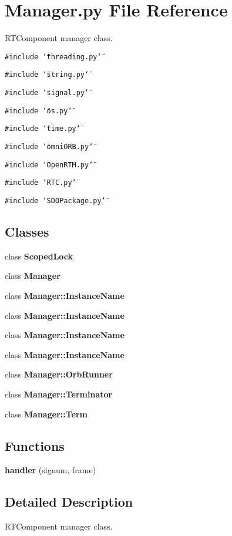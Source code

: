 \section{Manager.py File Reference}
\label{Manager_8py}
RTComponent manager class. 

{\tt \#include \char`\"{}threading.py\char`\"{}}\par
{\tt \#include \char`\"{}string.py\char`\"{}}\par
{\tt \#include \char`\"{}signal.py\char`\"{}}\par
{\tt \#include \char`\"{}os.py\char`\"{}}\par
{\tt \#include \char`\"{}time.py\char`\"{}}\par
{\tt \#include \char`\"{}omni\-ORB.py\char`\"{}}\par
{\tt \#include \char`\"{}Open\-RTM.py\char`\"{}}\par
{\tt \#include \char`\"{}RTC.py\char`\"{}}\par
{\tt \#include \char`\"{}SDOPackage.py\char`\"{}}\par
\subsection*{Classes}
\begin{CompactItemize}
\item 
class {\bf Scoped\-Lock}
\item 
class {\bf Manager}
\item 
class {\bf Manager::Instance\-Name}
\item 
class {\bf Manager::Instance\-Name}
\item 
class {\bf Manager::Instance\-Name}
\item 
class {\bf Manager::Instance\-Name}
\item 
class {\bf Manager::Orb\-Runner}
\item 
class {\bf Manager::Terminator}
\item 
class {\bf Manager::Term}
\end{CompactItemize}
\subsection*{Functions}
\begin{CompactItemize}
\item 
{\bf handler} (signum, frame)
\end{CompactItemize}


\subsection{Detailed Description}
RTComponent manager class. 

